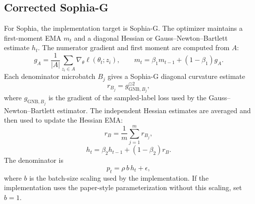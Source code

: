 \documentclass{article}
\begin{document}
\subsection{Corrected Sophia-G}
\label{app:sophia-implementation}

For Sophia, the implementation target is Sophia-G. The optimizer maintains a first-moment EMA $m_t$ and a diagonal Hessian or Gauss--Newton--Bartlett estimate $h_t$. The numerator gradient and first moment are computed from $A$:
\begin{equation}
    g_A
    =
    \frac{1}{|A|}\sum_{z_i\in A}\nabla_\theta \ell(\theta_t;z_i),
    \qquad
    m_t
    =
    \beta_1m_{t-1}+(1-\beta_1)g_A.
\end{equation}
Each denominator microbatch $B_j$ gives a Sophia-G diagonal curvature estimate
\begin{equation}
    r_{B_j}=g_{\mathrm{GNB},B_j}^{\odot 2},
\end{equation}
where $g_{\mathrm{GNB},B_j}$ is the gradient of the sampled-label loss used by the Gauss--Newton--Bartlett estimator. The independent Hessian estimates are averaged and then used to update the Hessian EMA:
\begin{equation}
    r_B=\frac{1}{m}\sum_{j=1}^m r_{B_j},
\end{equation}
\begin{equation}
    h_t
    =
    \beta_2h_{t-1}+(1-\beta_2)r_B.
\end{equation}
The denominator is
\begin{equation}
    p_t
    =
    \rho\, b\, h_t+\epsilon,
\end{equation}
where $b$ is the batch-size scaling used by the implementation. If the implementation uses the paper-style parameterization without this scaling, set $b=1$.
\end{document}
